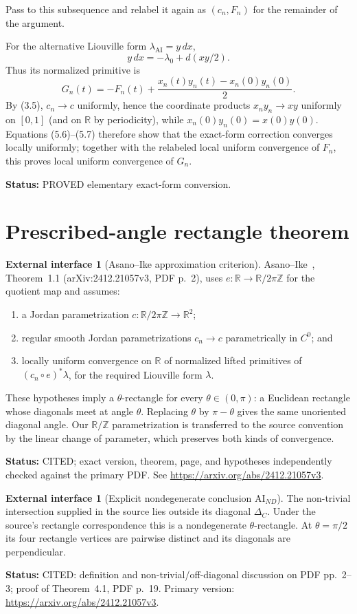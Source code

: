 \documentclass[11pt]{article}
\theoremstyle{definition}
\newtheorem{hypothesis}[theorem]{External interface}
\theoremstyle{remark}
\newcommand{\R}{\mathbb R}
\newcommand{\status}[1]{\par\smallskip\noindent\textbf{Status:}
  \begingroup\small\sffamily #1.\endgroup\par\smallskip}
\begin{document}
Pass to this subsequence and relabel it again as $(c_n,F_n)$ for the
remainder of the argument.

For the alternative Liouville form $\lambda_{\mathrm{AI}}=y\,dx$,
\[
 y\,dx=-\lambda_0+d(xy/2).                               \tag{5.6}
\]
Thus its normalized primitive is
\[
 G_n(t)=-F_n(t)
 +\frac{x_n(t)y_n(t)-x_n(0)y_n(0)}2.                     \tag{5.7}
\]
By (3.5), $c_n\to c$ uniformly, hence the coordinate products
$x_ny_n\to xy$ uniformly on $[0,1]$ (and on $\R$ by periodicity), while
$x_n(0)y_n(0)=x(0)y(0)$.  Equations (5.6)--(5.7) therefore show that the
exact-form correction converges locally uniformly; together with the
relabeled local uniform convergence of $F_n$, this proves local uniform
convergence of $G_n$.
\status{PROVED elementary exact-form conversion}

\section{Prescribed-angle rectangle theorem}

\begin{hypothesis}[Asano--Ike approximation criterion]\label{hyp:ai}
Asano--Ike~\cite{AI}, Theorem~1.1 (arXiv:2412.21057v3, PDF p.~2), uses
$e\colon\R\to\R/2\pi\mathbb Z$ for the quotient map and assumes:
\begin{enumerate}
\item a Jordan parametrization $c\colon\R/2\pi\mathbb Z\to\R^2$;
\item regular smooth Jordan parametrizations $c_n\to c$ parametrically in
  $C^0$; and
\item locally uniform convergence on $\R$ of normalized lifted primitives
  of $(c_n\circ e)^*\lambda$, for the required Liouville form $\lambda$.
\end{enumerate}
These hypotheses imply a $\theta$-rectangle for every $\theta\in(0,\pi)$:
a Euclidean rectangle whose diagonals meet at angle $\theta$.  Replacing
$\theta$ by $\pi-\theta$ gives the same unoriented diagonal angle.  Our
$\R/\mathbb Z$ parametrization is transferred to the source convention by
the linear change of parameter, which preserves both kinds of convergence.
\status{CITED; exact version, theorem, page, and hypotheses independently
checked against the primary PDF.  See
\url{https://arxiv.org/abs/2412.21057v3}}
\end{hypothesis}

\begin{hypothesis}[Explicit nondegenerate conclusion $\mathrm{AI}_{ND}$]
\label{hyp:aind}
The non-trivial intersection supplied in the source lies outside its
diagonal $\Delta_C$.  Under the source's rectangle correspondence this is a
nondegenerate $\theta$-rectangle.  At $\theta=\pi/2$ its four rectangle
vertices are pairwise distinct and its diagonals are perpendicular.
\status{CITED: definition and non-trivial/off-diagonal discussion on PDF
pp.~2--3; proof of Theorem~4.1, PDF p.~19.  Primary version:
\url{https://arxiv.org/abs/2412.21057v3}}
\end{hypothesis}
\end{document}
